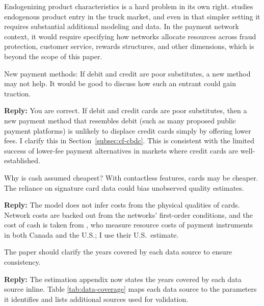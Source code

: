\documentclass[main.tex]{subfiles}
\begin{document}
\begin{refsection}
Endogenizing product characteristics is a hard problem in its own right.
\textcite{Wollmann2018} studies endogenous product entry in the truck market, and even in that simpler setting it requires substantial additional modeling and data.
In the payment network context, it would require specifying how networks allocate resources across fraud protection, customer service, rewards structures, and other dimensions, which is beyond the scope of this paper.

\begin{refcommentnoclear}
New payment methods: If debit and credit are poor substitutes, a new method may not help.
It would be good to discuss how such an entrant could gain traction.

\end{refcommentnoclear}

\textbf{Reply:} You are correct.
If debit and credit cards are poor substitutes, then a new payment method that resembles debit (such as many proposed public payment platforms) is unlikely to displace credit cards simply by offering lower fees.
I clarify this in Section~\ref{subsec:cf-cbdc}.
This is consistent with the limited success of lower-fee payment alternatives in markets where credit cards are well-established.

\begin{refcommentnoclear}
Why is cash assumed cheapest?
With contactless features, cards may be cheaper.
The reliance on signature card data could bias unobserved quality estimates.

\end{refcommentnoclear}

\textbf{Reply:} The model does not infer costs from the physical qualities of cards. Network costs are backed out from the networks' first-order conditions, and the cost of cash is taken from \textcite{Felt.etal2020}, who measure resource costs of payment instruments in both Canada and the U.S.; I use their U.S.\ estimate.

\begin{refcommentnoclear}
The paper should clarify the years covered by each data source to ensure consistency.

\end{refcommentnoclear}

\textbf{Reply:} The estimation appendix now states the years covered by each data source inline. Table \ref{tab:data-coverage} maps each data source to the parameters it identifies and lists additional sources used for validation.


\end{refsection}
\end{document}
